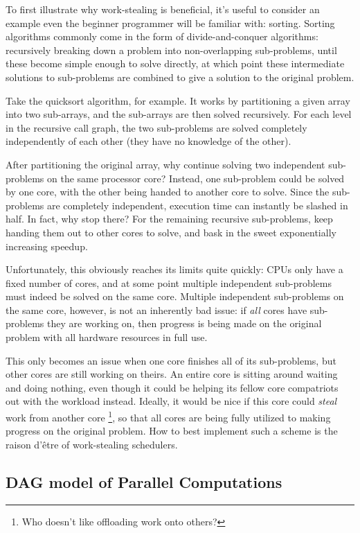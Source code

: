 \documentclass[bsc,frontabs,singlespacing,parskip,deptreport,normalheadings]{infthesis}
\begin{document}
To first illustrate why work-stealing is beneficial, it's useful to consider an
example even the beginner programmer will be familiar with: sorting. Sorting
algorithms commonly come in the form of divide-and-conquer algorithms:
recursively breaking down a problem into non-overlapping sub-problems, until
these become simple enough to solve directly, at which point these intermediate
solutions to sub-problems are combined to give a solution to the original
problem.

Take the quicksort algorithm, for example. It works by partitioning a given
array into two sub-arrays, and the sub-arrays are then solved recursively. For
each level in the recursive call graph, the two sub-problems are solved
completely independently of each other (they have no knowledge of the other).

After partitioning the original array, why continue solving two independent
sub-problems on the same processor core? Instead, one sub-problem could be
solved by one core, with the other being handed to another core to solve. Since
the sub-problems are completely independent, execution time can instantly be
slashed in half. In fact, why stop there? For the remaining recursive
sub-problems, keep handing them out to other cores to solve, and bask in the
sweet exponentially increasing speedup.

Unfortunately, this obviously reaches its limits quite quickly: CPUs only have a
fixed number of cores, and at some point multiple independent sub-problems must
indeed be solved on the same core. Multiple independent sub-problems on the
same core, however, is not an inherently bad issue: if \textit{all} cores have
sub-problems they are working on, then progress is being made on the original
problem with all hardware resources in full use.

This only becomes an issue when one core finishes all of its sub-problems, but
other cores are still working on theirs. An entire core is sitting around
waiting and doing nothing, even though it could be helping its fellow core
compatriots out with the workload instead. Ideally, it would be nice if this
core could \textit{steal} work from another core \footnote{Who doesn't like
offloading work onto others?}, so that all cores are being fully utilized to
making progress on the original problem. How to best implement such a scheme is
the raison d'être of work-stealing schedulers.

\subsection{DAG model of Parallel Computations}
\end{document}
